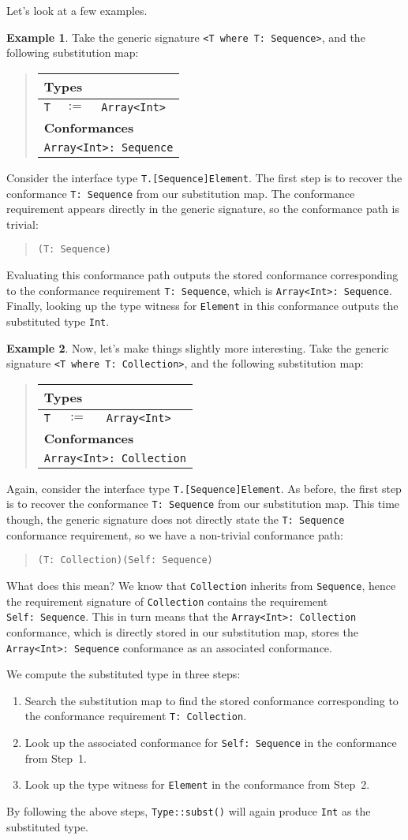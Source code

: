 \documentclass[a4paper,headsepline,bibliography=totoc,toc=flat,fleqn,twoside=semi]{scrbook}
\theoremstyle{definition}
\theoremstyle{definition}
\newtheorem{example}{Example}[chapter]
\theoremstyle{definition}
\newcommand{\SubMapC}[2]{\begin{tabular}{|lll|}
\hline
\multicolumn{3}{|l|}{\textbf{Types}}\\
\hline
#1\\
\hline
\hline
\multicolumn{3}{|l|}{\textbf{Conformances}}\\
\hline
#2\\
\hline
\end{tabular}}
\newcommand{\SubType}[2]{\texttt{#1}&$:=$&\texttt{#2}}
\newcommand{\SubConf}[1]{\multicolumn{3}{|l|}{\texttt{#1}}}
\begin{document}
Let's look at a few examples.

\begin{example}
Take the generic signature \texttt{<T where T:\ Sequence>}, and the following substitution map:
\begin{quote}
\SubMapC{
\SubType{T}{Array<Int>}
}{
\SubConf{Array<Int>:\ Sequence}
}
\end{quote}
Consider the interface type \texttt{T.[Sequence]Element}. The first step is to recover the conformance \texttt{T:\ Sequence} from our substitution map. The conformance requirement appears directly in the generic signature, so the conformance path is trivial:
\begin{quote}
\texttt{(T:\ Sequence)}
\end{quote}
Evaluating this conformance path outputs the stored conformance corresponding to the conformance requirement \texttt{T:\ Sequence}, which is \texttt{Array<Int>:\ Sequence}. Finally, looking up the type witness for \texttt{Element} in this conformance outputs the substituted type \texttt{Int}.
\end{example}

\begin{example}
Now, let's make things slightly more interesting. Take the generic signature \texttt{<T where T:\ Collection>}, and the following substitution map:
\begin{quote}
\SubMapC{
\SubType{T}{Array<Int>}
}{
\SubConf{Array<Int>:\ Collection}
}
\end{quote}
Again, consider the interface type \texttt{T.[Sequence]Element}. As before, the first step is to recover the conformance \texttt{T:\ Sequence} from our substitution map. This time though, the generic signature does not directly state the \texttt{T:\ Sequence} conformance requirement, so we have a non-trivial conformance path:
\begin{quote}
\texttt{(T:\ Collection)(Self:\ Sequence)}
\end{quote}
What does this mean? We know that \texttt{Collection} inherits from \texttt{Sequence}, hence the requirement signature of \texttt{Collection} contains the requirement \texttt{Self:\ Sequence}. This in turn means that the \texttt{Array<Int>:\ Collection} conformance, which is directly stored in our substitution map, stores the \texttt{Array<Int>:\ Sequence} conformance as an associated conformance.

We compute the substituted type in three steps:
\begin{enumerate}
\item Search the substitution map to find the stored conformance corresponding to the conformance requirement \texttt{T:\ Collection}.
\item Look up the associated conformance for \texttt{Self:\ Sequence} in the conformance from Step~1.
\item Look up the type witness for \texttt{Element} in the conformance from Step~2.
\end{enumerate}
By following the above steps, \texttt{Type::subst()} will again produce \texttt{Int} as the substituted type.
\end{example}
\end{document}
